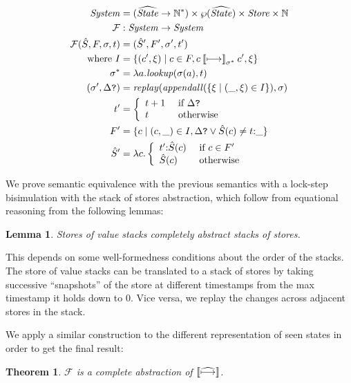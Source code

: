 \documentclass[9pt]{sigplanconf} %
\newtheorem{theorem}{Theorem}
\newtheorem{lemma}{Lemma}
\begin{document}
{\small
\begin{align*}
\mathit{System} &= (\widehat{\mathit{State}} \to {{\mathbb N}}^*) \times \wp(\widehat{\mathit{State}}) \times \mathit{Store} \times {\mathbb N} \\
{\mathcal F} &: \mathit{System} \to \mathit{System} \\
{\mathcal F}(\hat{S},F, \sigma,t) &= (\hat{S}',F',\sigma', t') \\
\text{ where }
I &= \{(c',\xi) \mid
       c \in F,
       c \mathbin{\llbracket\mathbin{\longmapsto}\rrbracket}_{\sigma^*} c',\xi\} \\
\sigma^* &= \lambda a.\mathit{lookup}(\sigma(a),t) \\
(\sigma', \Delta\mbox{{\tt ?}}) &= \mathit{replay}(\mathit{appendall}(\{\xi \mid (\_,\xi) \in I\}),\sigma) \\
t' &= \left\{\begin{array}{ll} t+1 & \text{ if } \Delta\mbox{{\tt ?}} \\
              t   & \text{ otherwise}
             \end{array}\right. \\
F' &= \{c \mid (c,\_) \in I, \Delta\mbox{{\tt ?}} \vee \hat{S}(c) \neq t {\tt :} \_\} \\
\hat{S}' &= \lambda c. \left\{\begin{array}{ll}
                               t' {\tt :} \hat{S}(c) & \text{ if } c \in F' \\
                               \hat{S}(c) & \text{ otherwise}
                             \end{array}\right.
\end{align*}}

We prove semantic equivalence with the previous semantics with a
lock-step bisimulation with the stack of stores abstraction, which
follow from equational reasoning from the following lemmas:

\begin{lemma}
Stores of value stacks completely abstract stacks of stores.
\end{lemma}
This depends on some well-formedness conditions about the order of the
stacks. The store of value stacks can be translated to a stack of
stores by taking successive ``snapshots'' of the store at different
timestamps from the max timestamp it holds down to 0. Vice versa, we
replay the changes across adjacent stores in the stack.

We apply a similar construction to the different representation of seen states in order to get the final result:

\begin{theorem}
${\mathcal F}$ is a complete abstraction of $\mathbin{\llbracket\widehat{\mathbin{\longmapsto}}\rrbracket}$.
\end{theorem}
\end{document}
